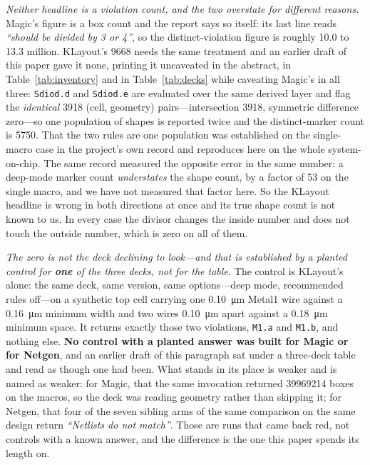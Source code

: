 \documentclass[11pt,a4paper]{article}
\begin{document}
\emph{Neither headline is a violation count, and the two overstate for
different reasons.} Magic's figure is a box count and the report says so
itself: its last line reads \emph{``should be divided by 3 or 4''}, so
the distinct-violation figure is roughly 10.0 to 13.3 million.
KLayout's \num{9668} needs the same treatment and an earlier draft of
this paper gave it none, printing it uncaveated in the abstract, in
Table~\ref{tab:inventory} and in Table~\ref{tab:decks} while caveating
Magic's in all three: \texttt{Sdiod.d} and \texttt{Sdiod.e} are
evaluated over the same derived layer and flag the \emph{identical}
\num{3918} (cell, geometry) pairs---intersection \num{3918}, symmetric
difference zero---so one population of shapes is reported twice and the
distinct-marker count is \num{5750}. That the two rules are one
population was established on the single-macro case in the project's own
record and reproduces here on the whole system-on-chip. The same record
measured the opposite error in the same number: a deep-mode marker count
\emph{understates} the shape count, by a factor of 53 on the single
macro, and we have not measured that factor here. So the KLayout
headline is wrong in both directions at once and its true shape count is
not known to us. In every case the divisor changes the inside number and
does not touch the outside number, which is zero on all of them.

\emph{The zero is not the deck declining to look---and that is
established by a planted control for \textbf{one} of the three decks,
not for the table.} The control is KLayout's alone: the same deck, same
version, same options---deep mode, recommended rules off---on a
synthetic top cell carrying one \SI{0.10}{\micro\meter} Metal1 wire
against a \SI{0.16}{\micro\meter} minimum width and two wires
\SI{0.10}{\micro\meter} apart against a \SI{0.18}{\micro\meter} minimum
space. It returns exactly those two violations, \texttt{M1.a} and
\texttt{M1.b}, and nothing else. \textbf{No control with a planted
answer was built for Magic or for Netgen}, and an earlier draft of this
paragraph sat under a three-deck table and read as though one had been.
What stands in its place is weaker and is named as weaker: for Magic,
that the same invocation returned \num{39969214} boxes on the macros, so
the deck was reading geometry rather than skipping it; for Netgen, that
four of the seven sibling arms of the same comparison on the same design
return \emph{``Netlists do not match''}. Those are runs that came back red, not
controls with a known answer, and the difference is the one this paper
spends its length on.
\end{document}
